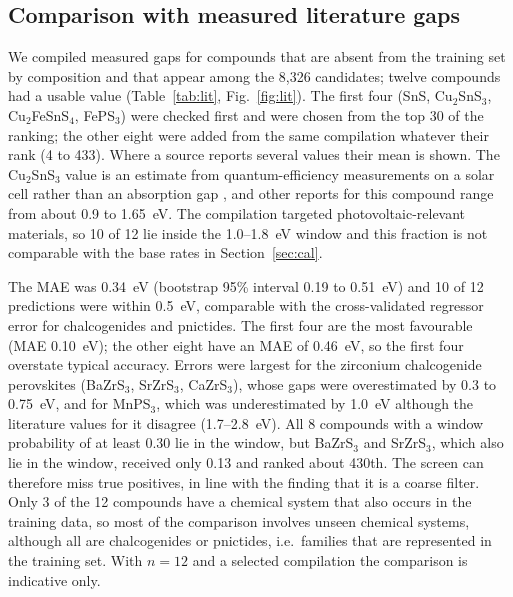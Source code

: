 \documentclass[11pt,a4paper]{article}
\begin{document}
\subsection{Comparison with measured literature gaps}
We compiled measured gaps for compounds that are absent from the training set by composition and that appear among the 8,326 candidates; twelve compounds had a usable value (Table~\ref{tab:lit}, Fig.~\ref{fig:lit}). The first four (SnS, Cu$_2$SnS$_3$, Cu$_2$FeSnS$_4$, FePS$_3$) were checked first and were chosen from the top 30 of the ranking; the other eight were added from the same compilation whatever their rank (4 to 433). Where a source reports several values their mean is shown. The Cu$_2$SnS$_3$ value is an estimate from quantum-efficiency measurements on a solar cell rather than an absorption gap \cite{Marquez2016}, and other reports for this compound range from about 0.9 to 1.65~eV. The compilation targeted photovoltaic-relevant materials, so 10 of 12 lie inside the 1.0--1.8~eV window and this fraction is not comparable with the base rates in Section~\ref{sec:cal}.

The MAE was 0.34~eV (bootstrap 95\% interval 0.19 to 0.51~eV) and 10 of 12 predictions were within 0.5~eV, comparable with the cross-validated regressor error for chalcogenides and pnictides. The first four are the most favourable (MAE 0.10~eV); the other eight have an MAE of 0.46~eV, so the first four overstate typical accuracy. Errors were largest for the zirconium chalcogenide perovskites (BaZrS$_3$, SrZrS$_3$, CaZrS$_3$), whose gaps were overestimated by 0.3 to 0.75~eV, and for MnPS$_3$, which was underestimated by 1.0~eV although the literature values for it disagree (1.7--2.8~eV). All 8 compounds with a window probability of at least 0.30 lie in the window, but BaZrS$_3$ and SrZrS$_3$, which also lie in the window, received only 0.13 and ranked about 430th. The screen can therefore miss true positives, in line with the finding that it is a coarse filter. Only 3 of the 12 compounds have a chemical system that also occurs in the training data, so most of the comparison involves unseen chemical systems, although all are chalcogenides or pnictides, i.e.\ families that are represented in the training set. With $n=12$ and a selected compilation the comparison is indicative only.
\end{document}
